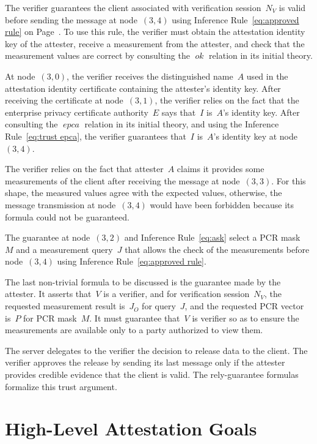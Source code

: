 \documentclass[titlepage,12pt]{article}
\theoremstyle{definition}
\DeclareMathOperator{\ok}{\mathit{ok}}
\DeclareMathOperator{\epca}{\mathit{epca}}
\begin{document}
The verifier guarantees the client associated with verification
session~$N_V$ is valid before sending the message at node~$(3,4)$
using Inference Rule~\ref{eq:approved rule} on
Page~\pageref{eq:approved rule}.  To use this rule, the verifier must
obtain the attestation identity key of the attester, receive a
measurement from the attester, and check that the measurement values
are correct by consulting the $\ok$ relation in its initial theory.

At node~$(3,0)$, the verifier receives the distinguished name~$A$ used
in the attestation identity certificate containing the attester's
identity key.  After receiving the certificate at node~$(3,1)$, the
verifier relies on the fact that the enterprise privacy certificate
authority~$E$ says that~$I$ is~$A$'s identity key.  After consulting
the $\epca$ relation in its initial theory, and using the Inference
Rule~\ref{eq:trust epca}, the verifier guarantees that~$I$ is~$A$'s
identity key at node~$(3,4)$.

The verifier relies on the fact that attester~$A$ claims it provides
some measurements of the client after receiving the message at
node~$(3,3)$.  For this shape, the measured values agree with the
expected values, otherwise, the message transmission at node~$(3,4)$
would have been forbidden because its formula could not be guaranteed.

The guarantee at node~$(3,2)$ and Inference Rule~\ref{eq:ask}
select a PCR mask~$M$ and a measurement query~$J$ that allows the
check of the measurements before node~$(3,4)$ using Inference
Rule~\ref{eq:approved rule}.

The last non-trivial formula to be discussed is the guarantee made by
the attester.  It asserts that~$V$ is a verifier, and for verification
session~$N_V$, the requested measurement result is~$J_O$ for
query~$J$, and the requested PCR vector is~$P$ for PCR mask~$M$.  It
must guarantee that~$V$ is verifier so as to ensure the measurements
are available only to a party authorized to view them.

The server delegates to the verifier the decision to release data to
the client.  The verifier approves the release by sending its last
message only if the attester provides credible evidence that the
client is valid.  The rely-guarantee formulas formalize this trust
argument.

\section{High-Level Attestation Goals}
\end{document}
